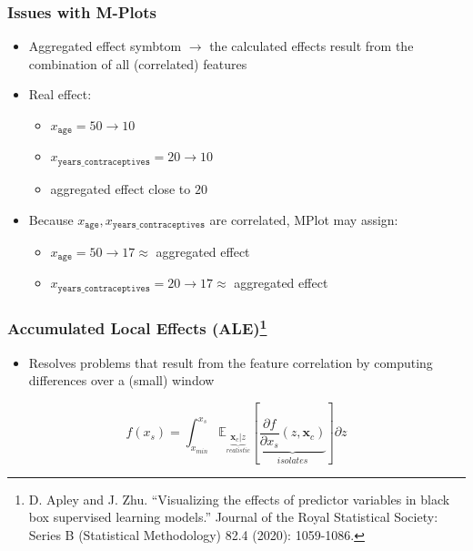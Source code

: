 \documentclass{beamer}
\newcommand{\Vx}{\mathbf{x}}
\begin{document}
\begin{frame}
  \frametitle{Issues with M-Plots}
  \begin{itemize}
  \item Aggregated effect symbtom \(\rightarrow\) the calculated
    effects result from the combination of all (correlated) features
  \item Real effect:
    \begin{itemize}
    \item \(x_{\mathtt{age}} = 50 \rightarrow 10\)
    \item  \(x_{\mathtt{years\_contraceptives}} = 20 \rightarrow 10\)
    \item  aggregated effect close to \(20\)
    \end{itemize}
  \item Because \(x_{\mathtt{age}}, x_{\mathtt{years\_contraceptives}}\) are correlated, MPlot may assign:
    \begin{itemize}
    \item \(x_{\mathtt{age}} = 50 \rightarrow 17 \approx \) aggregated effect
    \item  \(x_{\mathtt{years\_contraceptives}} = 20 \rightarrow 17 \approx \) aggregated effect
    \end{itemize}
  \end{itemize}
\end{frame}

\begin{frame}
  \frametitle{Accumulated Local Effects (ALE)\footnote{D. Apley and
    J. Zhu. ``Visualizing the effects of predictor variables in black box
    supervised learning models.'' Journal of the Royal Statistical Society:
    Series B (Statistical Methodology) 82.4 (2020): 1059-1086.}}

  \begin{itemize}
  \item Resolves problems that result from the feature correlation by computing
    differences over a (small) window
  \end{itemize}

  \[f(x_s) = \int_{x_{min}}^{x_s} \mathbb{E}_{\underbrace{\Vx_c|z}_{realistic}} [ \underbrace{\frac{\partial f}{\partial x_s}(z, \Vx_c)}_{isolates} ] \partial z\]

\end{frame}
\end{document}
